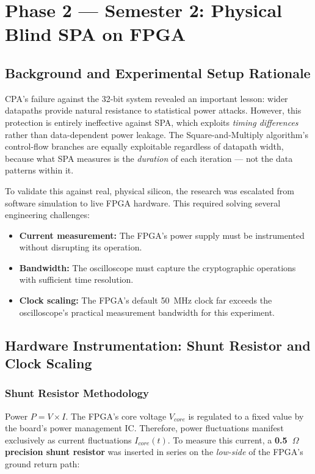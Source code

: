 \documentclass[conference, a4paper]{IEEEtran}
\begin{document}
\section{Phase 2 — Semester 2: Physical Blind SPA on FPGA}
\label{sec:spa}

\subsection{Background and Experimental Setup Rationale}

CPA's failure against the 32-bit system revealed an important lesson: wider datapaths provide natural resistance to statistical power attacks. However, this protection is entirely ineffective against SPA, which exploits \textit{timing differences} rather than data-dependent power leakage. The Square-and-Multiply algorithm's control-flow branches are equally exploitable regardless of datapath width, because what SPA measures is the \textit{duration} of each iteration — not the data patterns within it.

To validate this against real, physical silicon, the research was escalated from software simulation to live FPGA hardware. This required solving several engineering challenges:

\begin{itemize}
    \item \textbf{Current measurement:} The FPGA's power supply must be instrumented without disrupting its operation.
    \item \textbf{Bandwidth:} The oscilloscope must capture the cryptographic operations with sufficient time resolution.
    \item \textbf{Clock scaling:} The FPGA's default 50~MHz clock far exceeds the oscilloscope's practical measurement bandwidth for this experiment.
\end{itemize}

\subsection{Hardware Instrumentation: Shunt Resistor and Clock Scaling}

\subsubsection*{Shunt Resistor Methodology}
Power $P = V \times I$. The FPGA's core voltage $V_{core}$ is regulated to a fixed value by the board's power management IC. Therefore, power fluctuations manifest exclusively as current fluctuations $I_{core}(t)$. To measure this current, a \textbf{0.5~$\Omega$ precision shunt resistor} was inserted in series on the \textit{low-side} of the FPGA's ground return path:
\end{document}
